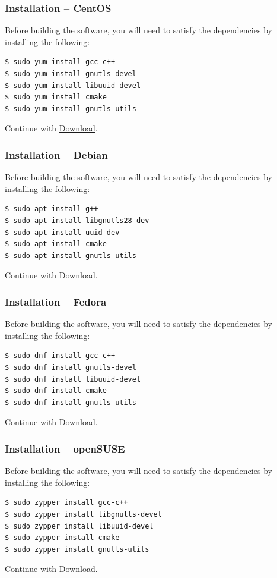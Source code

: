 \documentclass[t,handout]{beamer}
\begin{document}
\begin{frame}[fragile]\frametitle{Installation -- CentOS}\label{centos}
    \vfill
    Before building the software, you will need to satisfy the dependencies by installing the following:

    \begin{lstlisting}
$ sudo yum install gcc-c++
$ sudo yum install gnutls-devel
$ sudo yum install libuuid-devel
$ sudo yum install cmake
$ sudo yum install gnutls-utils\end{lstlisting}

    Continue with \hyperlink{download}{Download}.
\end{frame}

\begin{frame}[fragile]\frametitle{Installation -- Debian}\label{debian}
    \vfill
    Before building the software, you will need to satisfy the dependencies by installing the following:

    \begin{lstlisting}
$ sudo apt install g++
$ sudo apt install libgnutls28-dev
$ sudo apt install uuid-dev
$ sudo apt install cmake
$ sudo apt install gnutls-utils\end{lstlisting}

    Continue with \hyperlink{download}{Download}.
\end{frame}

\begin{frame}[fragile]\frametitle{Installation -- Fedora}\label{fedora}
    \vfill
    Before building the software, you will need to satisfy the dependencies by installing the following:

    \begin{lstlisting}
$ sudo dnf install gcc-c++
$ sudo dnf install gnutls-devel
$ sudo dnf install libuuid-devel
$ sudo dnf install cmake
$ sudo dnf install gnutls-utils\end{lstlisting}

    Continue with \hyperlink{download}{Download}.
\end{frame}

\begin{frame}[fragile]\frametitle{Installation -- openSUSE}\label{opensuse}
    \vfill
    Before building the software, you will need to satisfy the dependencies by installing the following:

    \begin{lstlisting}
$ sudo zypper install gcc-c++
$ sudo zypper install libgnutls-devel
$ sudo zypper install libuuid-devel
$ sudo zypper install cmake
$ sudo zypper install gnutls-utils\end{lstlisting}

    Continue with \hyperlink{download}{Download}.
\end{frame}
\end{document}
